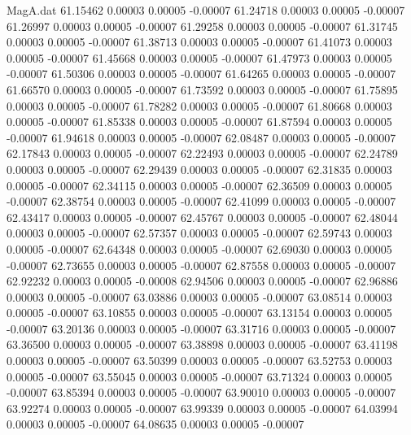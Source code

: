 \begin{filecontents}{MagA.dat}
  61.15462    0.00003    0.00005   -0.00007
  61.24718    0.00003    0.00005   -0.00007
  61.26997    0.00003    0.00005   -0.00007
  61.29258    0.00003    0.00005   -0.00007
  61.31745    0.00003    0.00005   -0.00007
  61.38713    0.00003    0.00005   -0.00007
  61.41073    0.00003    0.00005   -0.00007
  61.45668    0.00003    0.00005   -0.00007
  61.47973    0.00003    0.00005   -0.00007
  61.50306    0.00003    0.00005   -0.00007
  61.64265    0.00003    0.00005   -0.00007
  61.66570    0.00003    0.00005   -0.00007
  61.73592    0.00003    0.00005   -0.00007
  61.75895    0.00003    0.00005   -0.00007
  61.78282    0.00003    0.00005   -0.00007
  61.80668    0.00003    0.00005   -0.00007
  61.85338    0.00003    0.00005   -0.00007
  61.87594    0.00003    0.00005   -0.00007
  61.94618    0.00003    0.00005   -0.00007
  62.08487    0.00003    0.00005   -0.00007
  62.17843    0.00003    0.00005   -0.00007
  62.22493    0.00003    0.00005   -0.00007
  62.24789    0.00003    0.00005   -0.00007
  62.29439    0.00003    0.00005   -0.00007
  62.31835    0.00003    0.00005   -0.00007
  62.34115    0.00003    0.00005   -0.00007
  62.36509    0.00003    0.00005   -0.00007
  62.38754    0.00003    0.00005   -0.00007
  62.41099    0.00003    0.00005   -0.00007
  62.43417    0.00003    0.00005   -0.00007
  62.45767    0.00003    0.00005   -0.00007
  62.48044    0.00003    0.00005   -0.00007
  62.57357    0.00003    0.00005   -0.00007
  62.59743    0.00003    0.00005   -0.00007
  62.64348    0.00003    0.00005   -0.00007
  62.69030    0.00003    0.00005   -0.00007
  62.73655    0.00003    0.00005   -0.00007
  62.87558    0.00003    0.00005   -0.00007
  62.92232    0.00003    0.00005   -0.00008
  62.94506    0.00003    0.00005   -0.00007
  62.96886    0.00003    0.00005   -0.00007
  63.03886    0.00003    0.00005   -0.00007
  63.08514    0.00003    0.00005   -0.00007
  63.10855    0.00003    0.00005   -0.00007
  63.13154    0.00003    0.00005   -0.00007
  63.20136    0.00003    0.00005   -0.00007
  63.31716    0.00003    0.00005   -0.00007
  63.36500    0.00003    0.00005   -0.00007
  63.38898    0.00003    0.00005   -0.00007
  63.41198    0.00003    0.00005   -0.00007
  63.50399    0.00003    0.00005   -0.00007
  63.52753    0.00003    0.00005   -0.00007
  63.55045    0.00003    0.00005   -0.00007
  63.71324    0.00003    0.00005   -0.00007
  63.85394    0.00003    0.00005   -0.00007
  63.90010    0.00003    0.00005   -0.00007
  63.92274    0.00003    0.00005   -0.00007
  63.99339    0.00003    0.00005   -0.00007
  64.03994    0.00003    0.00005   -0.00007
  64.08635    0.00003    0.00005   -0.00007

\end{filecontents}
